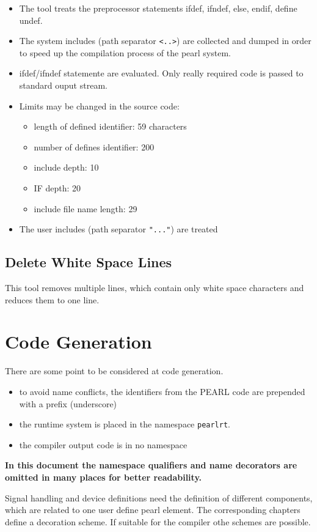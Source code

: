 \begin{itemize}
\item The tool treats the preprocessor statements 
ifdef, ifndef, else, endif, define undef.
\item The system includes (path separator \verb|<..>|) are collected
and dumped in order to speed up the compilation process of the 
pearl system.
\item ifdef/ifndef statemente are evaluated. Only really required code
   is passed to standard ouput stream.
\item Limits may be changed in the source code: 
   \begin{itemize}
   \item length of defined identifier: 59 characters
   \item number of defines identifier: 200
   \item include depth: 10
   \item IF depth: 20
   \item include file name length: 29
   \end{itemize}
\item The user includes (path separator \verb|"..."|) are treated
\end{itemize}
 

\subsection{Delete White Space Lines}
This tool removes multiple lines, which contain only white space characters
and reduces them to one line.

\section{Code Generation}
There are some point to be considered at code generation.
\begin{itemize}
\item to avoid name conflicts, the identifiers from the PEARL code
   are prepended with a prefix  (underscore)
\item the runtime system is placed in the namespace \verb|pearlrt|.
\item the compiler output code is in no namespace
\end{itemize}

\textbf{
In this document the namespace qualifiers  and name decorators 
are omitted in many places for better readability.
}

Signal handling and device definitions need the definition of 
different components, which are related to one user define pearl 
element.
The corresponding chapters define a decoration scheme. If suitable
for the compiler othe schemes are possible. 


